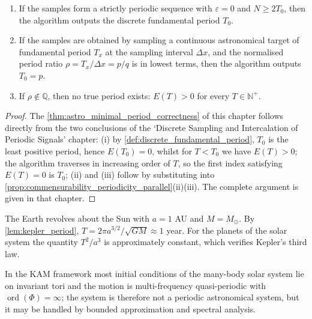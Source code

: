 \begin{theorem}\label{thm:astro_minimal_period_correctness}
\leavevmode\par
\begin{enumerate}[label=(\roman*)]
    \item If the samples form a strictly periodic sequence with \(\varepsilon=0\) and \(N\ge2T_0\), then the algorithm outputs the discrete fundamental period \(T_0\).
    \item If the samples are obtained by sampling a continuous astronomical target of fundamental period \(T_x\) at the sampling interval \(\Delta x\), and the normalised period ratio \(\rho=T_x/\Delta x=p/q\) is in lowest terms, then the algorithm outputs \(T_0=p\).
    \item If \(\rho\notin\mathbb Q\), then no true period exists: \(E(T)>0\) for every \(T\in\mathbb N^+\).
\end{enumerate}
\end{theorem}

\begin{proof}
The \cref{thm:astro_minimal_period_correctness} of this chapter follows directly from the two conclusions of the `Discrete Sampling and Intercalation of Periodic Signals' chapter:
(i) by \cref{def:discrete_fundamental_period}, $T_0$ is the least positive period, hence $E(T_0)=0$, whilst for $T<T_0$ we have $E(T)>0$;
the algorithm traverses in increasing order of $T$, so the first index satisfying $E(T)=0$ is $T_0$;
(ii) and (iii) follow by substituting into \cref{prop:commensurability_periodicity_parallel}(ii)(iii). The complete argument is given in that chapter.
\end{proof}

\begin{example}\label{ex:astro_kepler_period}
The Earth revolves about the Sun with \(a=1\) AU and \(M=M_\odot\). By \cref{lem:kepler_period}, \(T=2\pi a^{3/2}/\sqrt{GM}\approx1\) year. For the planets of the solar system the quantity \(T^2/a^3\) is approximately constant, which verifies Kepler's third law.
\end{example}

\begin{example}\label{ex:astro_nbody_quasiperiodic}
In the KAM framework most initial conditions of the many-body solar system lie on invariant tori and the motion is multi-frequency quasi-periodic with \(\operatorname{ord}(\Phi)=\infty\); the system is therefore not a periodic astronomical system, but it may be handled by bounded approximation and spectral analysis.
\end{example}

